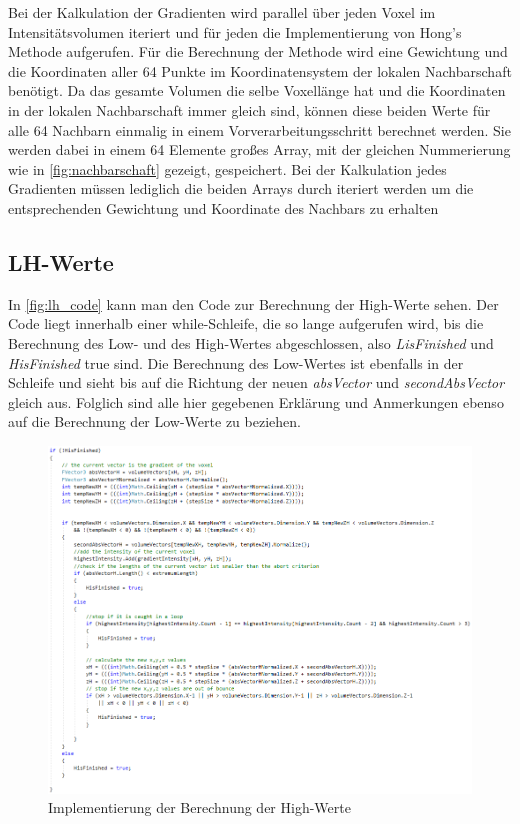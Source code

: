 Bei der  Kalkulation der Gradienten wird parallel über jeden Voxel im Intensitätsvolumen iteriert und für jeden die Implementierung von Hong's Methode \cite{hong2003method} aufgerufen.
\newline
Für die Berechnung der Methode wird eine Gewichtung und die Koordinaten aller 64 Punkte im Koordinatensystem der lokalen Nachbarschaft benötigt. Da das gesamte Volumen die selbe Voxellänge hat und die Koordinaten in der lokalen Nachbarschaft immer gleich sind, können diese beiden Werte für alle 64 Nachbarn einmalig in einem Vorverarbeitungsschritt berechnet werden. Sie werden dabei in einem 64 Elemente großes Array, mit der gleichen Nummerierung wie in \autoref{fig:nachbarschaft} gezeigt, gespeichert. Bei der Kalkulation jedes Gradienten müssen lediglich die beiden Arrays durch iteriert werden um die entsprechenden Gewichtung und Koordinate  des Nachbars zu erhalten

\subsection{LH-Werte}

In \autoref{fig:lh_code} kann man den Code zur Berechnung der High-Werte sehen. Der Code liegt innerhalb einer while-Schleife, die so lange aufgerufen wird, bis die Berechnung des Low- und des High-Wertes abgeschlossen, also \textit{LisFinished} und \textit{HisFinished} true sind. Die Berechnung des Low-Wertes ist ebenfalls in der Schleife und sieht bis auf die Richtung der neuen \textit{absVector} und \textit{secondAbsVector} gleich aus. Folglich sind alle hier gegebenen Erklärung und Anmerkungen ebenso auf die Berechnung der Low-Werte zu beziehen.


\begin{figure}[!h] 
\includegraphics[width=1.2\textwidth]{Logos/LH_Code.PNG}
\caption{Implementierung der Berechnung der High-Werte} 
\label{fig:lh_code} 
\end{figure}


